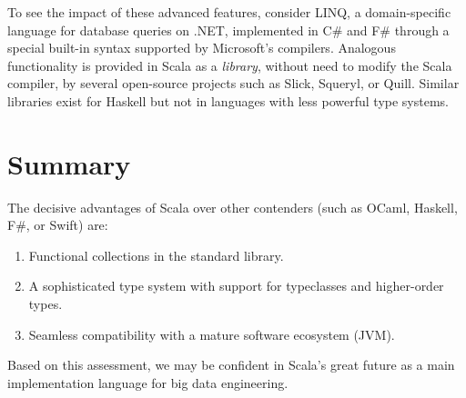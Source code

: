 To see the impact of these advanced features, consider LINQ, a domain-specific
language for database queries on .NET, implemented in C\# and F\#
through a special built-in syntax supported by Microsoft's compilers.
Analogous functionality is provided in Scala as a \emph{library},
without need to modify the Scala compiler, by several open-source
projects such as Slick, Squeryl, or Quill. Similar libraries exist
for Haskell \textendash{} but not in languages with less powerful
type systems.

\section{Summary}

The decisive advantages of Scala over other contenders (such as OCaml,
Haskell, F\#, or Swift) are:
\begin{enumerate}
\item Functional collections in the standard library.
\item A sophisticated type system with support for typeclasses and higher-order
types.
\item Seamless compatibility with a mature software ecosystem (JVM).
\end{enumerate}
Based on this assessment, we may be confident in Scala's great future
as a main implementation language for big data engineering. 
